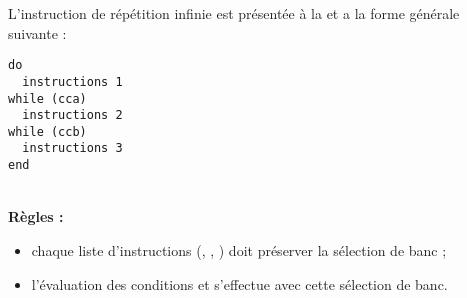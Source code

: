 
L'instruction de répétition infinie est présentée à la  et a la forme générale suivante :

\begin{lstlisting}[language=piccolo]
do
  instructions 1
while (cca)
  instructions 2
while (ccb)
  instructions 3
end
\end{lstlisting}

~\\
\textbf{Règles :}
\begin{itemize}
  \item chaque liste d'instructions (, , ) doit préserver la sélection de banc ;
  \item l'évaluation des conditions  et  s'effectue avec cette sélection de banc.
\end{itemize}
